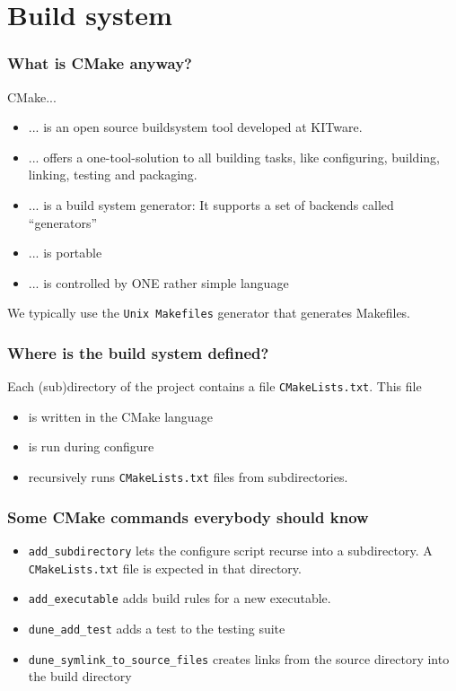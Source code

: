 \documentclass[aspectratio=169,11pt]{beamer}
\theoremstyle{definition}
\begin{document}
\section{Build system}


\begin{frame}[fragile]
 \frametitle{What is CMake anyway?}
 CMake...
 \begin{itemize}
  \item ... is an open source buildsystem tool developed at KITware.
  \item ... offers a one-tool-solution to all building tasks, like configuring, building, linking, testing and packaging.
  \item ... is a build system generator: It supports a set of backends called ``generators''
  \item ... is portable
  \item ... is controlled by ONE rather simple language
 \end{itemize}
 \vspace{0.5cm}
 We typically use the \lstinline!Unix Makefiles! generator that generates Makefiles.
\end{frame}

\begin{frame}[fragile]
 \frametitle{Where is the build system defined?}
 Each (sub)directory of the project contains a file \lstinline!CMakeLists.txt!. This file
 \begin{itemize}
  \item is written in the CMake language
  \item is run during configure
  \item recursively runs \lstinline!CMakeLists.txt! files from subdirectories.
 \end{itemize}
\end{frame}

\begin{frame}[fragile]
 \frametitle{Some CMake commands everybody should know}

 \begin{itemize}
  \item \lstinline!add_subdirectory! lets the configure script recurse into a subdirectory.
  A \lstinline!CMakeLists.txt! file is expected in that directory.
  \item \lstinline!add_executable! adds build rules for a new executable.
  \item \lstinline!dune_add_test! adds a test to the testing suite
  \item \lstinline!dune_symlink_to_source_files! creates links from the source directory into the build directory
 \end{itemize}
\end{frame}
\end{document}
